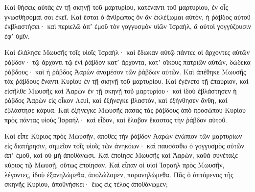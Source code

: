{Καὶ θήσεις αὐτὰς ἐν τῇ σκηνῇ τοῦ μαρτυρίου, κατέναντι τοῦ μαρτυρίου, ἐν οἷς γνωσθήσομαί σοι ἐκεῖ.
Καὶ ἔσται ὁ ἄνθρωπος ὃν ἂν ἐκλέξωμαι αὐτὸν, ἡ ῥάβδος αὐτοῦ ἐκβλαστήσει· καὶ περιελῶ ἀπʼ ἐμοῦ τὸν γογγυσμὸν υἱῶν Ἰσραήλ, ἃ αὐτοὶ γογγύζουσιν ἐφʼ ὑμῖν.
\par }{\PP {}Καὶ ἐλάλησε Μωυσῆς τοῖς υἱοῖς Ἰσραήλ· καὶ ἔδωκαν αὐτῷ πάντες οἱ ἄρχοντες αὐτῶν ῥάβδον· τῷ ἄρχοντι τῷ ἑνὶ ῥάβδον κατʼ ἄρχοντα, κατʼ οἴκους πατριῶν αὐτῶν, δώδεκα ῥάβδους· καὶ ἡ ῥάβδος Ἀαρὼν ἀναμέσον τῶν ῥάβδων αὐτῶν.
Καὶ ἀπέθηκε Μωυσῆς τὰς ῥάβδους ἔναντι Κυρίου ἐν τῇ σκηνῇ τοῦ μαρτυρίου.
Καὶ ἐγένετο τῇ ἐπαύριον, καὶ εἰσῆλθε Μωυσῆς καὶ Ἀαρὼν ἐν τῇ σκηνῇ τοῦ μαρτυρίου· καὶ ἰδοὺ ἐβλάστησεν ἡ ῥάβδος Ἀαρὼν εἰς οἶκον Λευί, καὶ ἐξήνεγκε βλαστὸν, καὶ ἐξήνθησεν ἄνθη, καὶ ἐβλάστησε κάρυα.
Καὶ ἐξήνεγκε Μωυσῆς πάσας τὰς ῥάβδους ἀπὸ προσώπου Κυρίου πρὸς πάντας υἱοὺς Ἰσραήλ· καὶ εἶδον, καὶ ἔλαβον ἕκαστος τὴν ῥάβδον αὐτοῦ.
\par }{\PP {}Καὶ εἶπε Κύριος πρὸς Μωυσῆν, ἀπόθες τὴν ῥάβδον Ἀαρὼν ἐνώπιον τῶν μαρτυρίων εἰς διατήρησιν, σημεῖον τοῖς υἱοῖς τῶν ἀνηκόων· καὶ παυσάσθω ὁ γογγυσμὸς αὐτῶν ἀπʼ ἐμοῦ, καὶ οὐ μὴ ἀποθάνωσι.
Καὶ ἐποίησε Μωυσῆς καὶ Ἀαρὼν, καθὰ συνέταξε κύριος τῷ Μωυσῇ, οὕτως ἐποίησαν.
Καὶ εἶπαν οἱ υἱοὶ Ἰσραὴλ πρὸς Μωυσῆν, λέγοντες, ἰδοὺ ἐξανηλώμεθα, ἀπολώλαμεν, παρανηλώμεθα.
Πᾶς ὁ ἁπτόμενος τῆς σκηνῆς Κυρίου, ἀποθνήσκει· ἕως εἰς τέλος ἀποθάνωμεν;

}
